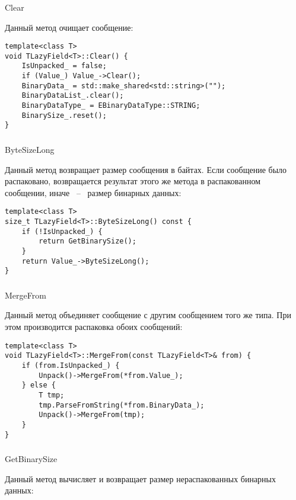 \subsubsection{} Clear

Данный метод очищает сообщение:

\begin{lstlisting}[style=CodeListing]
template<class T>
void TLazyField<T>::Clear() {
    IsUnpacked_ = false;
    if (Value_) Value_->Clear();
    BinaryData_ = std::make_shared<std::string>("");
    BinaryDataList_.clear();
    BinaryDataType_ = EBinaryDataType::STRING;
    BinarySize_.reset();
}
\end{lstlisting}

\subsubsection{} ByteSizeLong

Данный метод возвращает размер сообщения в байтах. Если сообщение было распаковано, возвращается результат этого же метода в распакованном сообщении, иначе ~--~ размер бинарных данных:

\begin{lstlisting}
template<class T>
size_t TLazyField<T>::ByteSizeLong() const {
    if (!IsUnpacked_) {
        return GetBinarySize();
    }
    return Value_->ByteSizeLong();
}
\end{lstlisting}

\subsubsection{} MergeFrom

Данный метод объединяет сообщение с другим сообщением того же типа. При этом производится распаковка обоих сообщений:

\begin{lstlisting}[style=CodeListing]
template<class T>
void TLazyField<T>::MergeFrom(const TLazyField<T>& from) {
    if (from.IsUnpacked_) {
        Unpack()->MergeFrom(*from.Value_);
    } else {
        T tmp;
        tmp.ParseFromString(*from.BinaryData_);
        Unpack()->MergeFrom(tmp);
    }
}
\end{lstlisting}

\subsubsection{} GetBinarySize

Данный метод вычисляет и возвращает размер нераспакованных бинарных данных:

